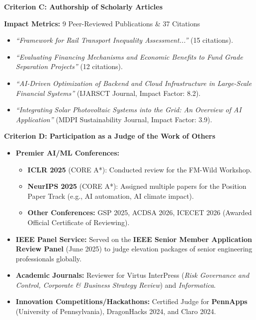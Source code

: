 \documentclass[11pt]{article}
\begin{document}
\vspace{0.5em}
{\large\bfseries Criterion C: Authorship of Scholarly Articles}

\textbf{Impact Metrics:} 9 Peer-Reviewed Publications \& 37 Citations
\begin{itemize}
    \item \textit{``Framework for Rail Transport Inequality Assessment...''} (15 citations).
    \item \textit{``Evaluating Financing Mechanisms and Economic Benefits to Fund Grade Separation Projects''} (12 citations).
    \item \textit{``AI-Driven Optimization of Backend and Cloud Infrastructure in Large-Scale Financial Systems''} (IJARSCT Journal, Impact Factor: 8.2).
    \item \textit{``Integrating Solar Photovoltaic Systems into the Grid: An Overview of AI Application''} (MDPI Sustainability Journal, Impact Factor: 3.9).
\end{itemize}

\vspace{0.5em}
{\large\bfseries Criterion D: Participation as a Judge of the Work of Others}
\begin{itemize}
    \item \textbf{Premier AI/ML Conferences:}
    \begin{itemize}
        \item \textbf{ICLR 2025} (CORE A*): Conducted review for the FM-Wild Workshop.
        \item \textbf{NeurIPS 2025} (CORE A*): Assigned multiple papers for the Position Paper Track (e.g., AI automation, AI climate impact).
        \item \textbf{Other Conferences:} GSP 2025, ACDSA 2026, ICECET 2026 (Awarded Official Certificate of Reviewing).
    \end{itemize}
    \item \textbf{IEEE Panel Service:} Served on the \textbf{IEEE Senior Member Application Review Panel} (June 2025) to judge elevation packages of senior engineering professionals globally.
    \item \textbf{Academic Journals:} Reviewer for Virtus InterPress (\textit{Risk Governance and Control, Corporate \& Business Strategy Review}) and \textit{Informatica}.
    \item \textbf{Innovation Competitions/Hackathons:} Certified Judge for \textbf{PennApps} (University of Pennsylvania), DragonHacks 2024, and Claro 2024.
\end{itemize}
\end{document}
